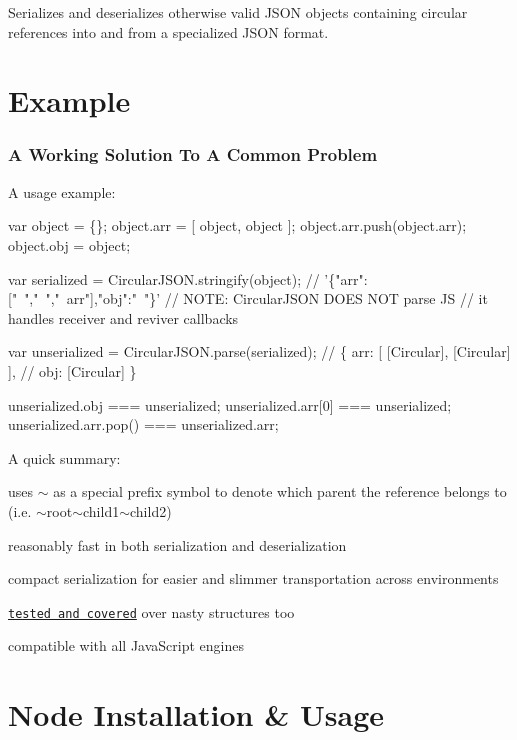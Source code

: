 \href{http://travis-ci.org/WebReflection/circular-json}{\tt }

Serializes and deserializes otherwise valid J\+S\+ON objects containing circular references into and from a specialized J\+S\+ON format.

\section*{Example }

\subsubsection*{A Working Solution To A Common Problem}

A usage example\+:


\begin{DoxyCode}
var object = \{\};
object.arr = [
  object, object
];
object.arr.push(object.arr);
object.obj = object;

var serialized = CircularJSON.stringify(object);
// '\{"arr":["~","~","~arr"],"obj":"~"\}'
// NOTE: CircularJSON DOES NOT parse JS
// it handles receiver and reviver callbacks

var unserialized = CircularJSON.parse(serialized);
// \{ arr: [ [Circular], [Circular] ],
// obj: [Circular] \}

unserialized.obj === unserialized;
unserialized.arr[0] === unserialized;
unserialized.arr.pop() === unserialized.arr;
\end{DoxyCode}


A quick summary\+:


\begin{DoxyItemize}
\item uses {\ttfamily $\sim$} as a special prefix symbol to denote which parent the reference belongs to (i.\+e. {\ttfamily $\sim$root$\sim$child1$\sim$child2})
\item reasonably fast in both serialization and deserialization
\item compact serialization for easier and slimmer transportation across environments
\item \href{test/circular-json.js}{\tt tested and covered} over nasty structures too
\item compatible with all Java\+Script engines
\end{DoxyItemize}

\section*{Node Installation \& Usage }


